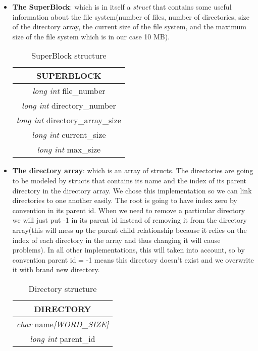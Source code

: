 \begin{itemize}
    \item \textbf{The SuperBlock}: which is in itself a \textit{struct} that contains some useful information about the file system(number of files, number of directories, size of the directory array, the current size of the file system, and the maximum size of the file system which is in our case 10 MB).\\

    \begin{table}[hbt!]
        \centering
        \begin{tabular}{|c|}
            \hline
            \textbf{SUPERBLOCK} \\
            \hline
            \textit{long int} file\_number \\
            \textit{long int} directory\_number \\
            \textit{long int} directory\_array\_size \\
            \textit{long int} current\_size \\
            \textit{long int} max\_size \\
            \hline
        \end{tabular}
        \caption{SuperBlock structure}
        \label{tab:my_label}
    \end{table}
    
    \item \textbf{The directory array}: which is an array of structs.
    The directories are going to be modeled by structs that contains its name and the index of its parent directory in the directory array. 
    We chose this implementation so we can link directories to one another easily.
    The root is going to have index zero by convention in its parent id. 
    When we need to remove a particular directory we will just put -1 in its parent id instead of removing it from the directory array(this will mess up the parent child relationship because it relies on the index of each directory in the array and thus changing it will cause problems). 
    In all other implementations, this will taken into account, so by convention parent id = -1 means this directory doesn't exist and we overwrite it with brand new directory.\\

    \begin{table}[hbt!]
        \centering
        \begin{tabular}{|c|}
            \hline
            \textbf{DIRECTORY} \\
            \hline
            \textit{char} name\textit{[WORD\_SIZE]} \\
            \textit{long int} parent\_id \\
            \hline
        \end{tabular}
        \caption{Directory structure}
        \label{tab:my_label}
    \end{table}


\end{itemize}
